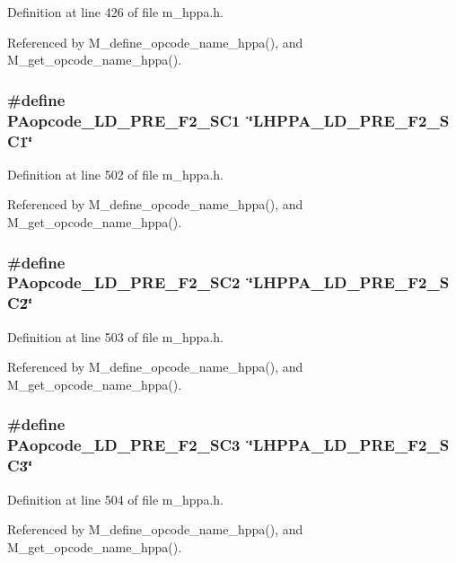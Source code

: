 Definition at line 426 of file m\_\-hppa.h.

Referenced by M\_\-define\_\-opcode\_\-name\_\-hppa(), and M\_\-get\_\-opcode\_\-name\_\-hppa().
\subsubsection{\setlength{\rightskip}{0pt plus 5cm}\#define PAopcode\_\-LD\_\-PRE\_\-F2\_\-SC1~\char`\"{}LHPPA\_\-LD\_\-PRE\_\-F2\_\-SC1\char`\"{}}\label{m__hppa_8h_25469de9ae484ff0df98b900796054c4}




Definition at line 502 of file m\_\-hppa.h.

Referenced by M\_\-define\_\-opcode\_\-name\_\-hppa(), and M\_\-get\_\-opcode\_\-name\_\-hppa().
\subsubsection{\setlength{\rightskip}{0pt plus 5cm}\#define PAopcode\_\-LD\_\-PRE\_\-F2\_\-SC2~\char`\"{}LHPPA\_\-LD\_\-PRE\_\-F2\_\-SC2\char`\"{}}\label{m__hppa_8h_6bb3b35a1358bb2b4100fb1161166167}




Definition at line 503 of file m\_\-hppa.h.

Referenced by M\_\-define\_\-opcode\_\-name\_\-hppa(), and M\_\-get\_\-opcode\_\-name\_\-hppa().
\subsubsection{\setlength{\rightskip}{0pt plus 5cm}\#define PAopcode\_\-LD\_\-PRE\_\-F2\_\-SC3~\char`\"{}LHPPA\_\-LD\_\-PRE\_\-F2\_\-SC3\char`\"{}}\label{m__hppa_8h_18dd9a4d437d1ef70175261cd27951b0}




Definition at line 504 of file m\_\-hppa.h.

Referenced by M\_\-define\_\-opcode\_\-name\_\-hppa(), and M\_\-get\_\-opcode\_\-name\_\-hppa().
